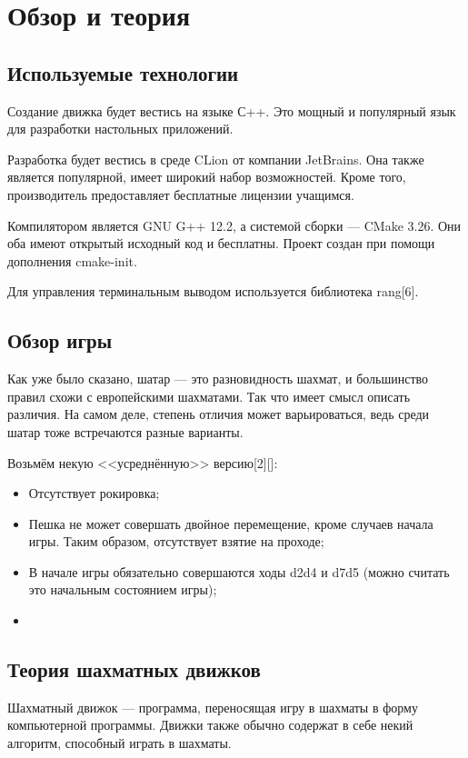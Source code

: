 {

	\chapter{Обзор и теория}
	\section{Используемые технологии}
	Создание движка будет вестись на языке С++. Это мощный и  популярный язык для разработки настольных приложений.
	
	Разработка будет вестись в среде CLion от компании JetBrains. Она также является популярной, имеет широкий набор возможностей. Кроме того, производитель предоставляет бесплатные лицензии учащимся. 
	
	Компилятором является GNU G++ 12.2, а системой сборки --- CMake 3.26. Они оба имеют открытый исходный код и бесплатны. Проект создан при помощи дополнения cmake-init.
	
	Для управления терминальным выводом используется библиотека rang[6].
	
	\section{Обзор игры}
	
	Как уже было сказано, шатар --- это разновидность шахмат, и большинство правил схожи с европейскими шахматами. Так что имеет смысл описать различия.
	На самом деле, степень отличия может варьироваться, ведь среди шатар тоже встречаются разные варианты. 
	
	Возьмём некую <<усреднённую>> версию[2][]:
	
	\begin{itemize}
		\item Отсутствует рокировка;
		\item Пешка не может совершать двойное перемещение, кроме случаев начала игры. Таким образом, отсутствует взятие на проходе;
		\item В начале игры обязательно совершаются ходы d2d4 и d7d5 (можно считать это начальным состоянием игры);
		\item 
	\end{itemize}
	
	\section{Теория шахматных движков}
	
	Шахматный движок --- программа, переносящая игру в шахматы в форму компьютерной программы. Движки также обычно содержат в себе некий алгоритм, способный играть в шахматы.
	
}
